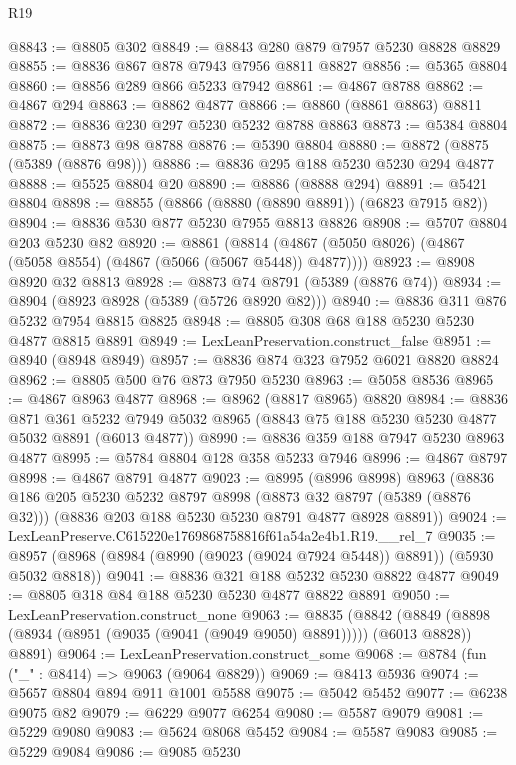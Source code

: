 \begin{lexlean}{R19}
\begin{coremodule}
@8843 := @8805 @302
@8849 := @8843 @280 @879 @7957 @5230 @8828 @8829
@8855 := @8836 @867 @878 @7943 @7956 @8811 @8827
@8856 := @5365 @8804
@8860 := @8856 @289 @866 @5233 @7942
@8861 := @4867 @8788
@8862 := @4867 @294
@8863 := @8862 @4877
@8866 := @8860 (@8861 @8863) @8811
@8872 := @8836 @230 @297 @5230 @5232 @8788 @8863
@8873 := @5384 @8804
@8875 := @8873 @98 @8788
@8876 := @5390 @8804
@8880 := @8872 (@8875 (@5389 (@8876 @98)))
@8886 := @8836 @295 @188 @5230 @5230 @294 @4877
@8888 := @5525 @8804 @20
@8890 := @8886 (@8888 @294)
@8891 := @5421 @8804
@8898 := @8855 (@8866 (@8880 (@8890 @8891)) (@6823 @7915 @82))
@8904 := @8836 @530 @877 @5230 @7955 @8813 @8826
@8908 := @5707 @8804 @203 @5230 @82
@8920 := @8861
    (@8814 (@4867 (@5050 @8026) (@4867 (@5058 @8554) (@4867 (@5066 (@5067 @5448)) @4877))))
@8923 := @8908 @8920 @32 @8813
@8928 := @8873 @74 @8791 (@5389 (@8876 @74))
@8934 := @8904 (@8923 @8928 (@5389 (@5726 @8920 @82)))
@8940 := @8836 @311 @876 @5232 @7954 @8815 @8825
@8948 := @8805 @308 @68 @188 @5230 @5230 @4877 @8815 @8891
@8949 := LexLeanPreservation.construct_false
@8951 := @8940 (@8948 @8949)
@8957 := @8836 @874 @323 @7952 @6021 @8820 @8824
@8962 := @8805 @500 @76 @873 @7950 @5230
@8963 := @5058 @8536
@8965 := @4867 @8963 @4877
@8968 := @8962 (@8817 @8965) @8820
@8984 := @8836
    @871
    @361
    @5232
    @7949
    @5032
    @8965
    (@8843 @75 @188 @5230 @5230 @4877 @5032 @8891 (@6013 @4877))
@8990 := @8836 @359 @188 @7947 @5230 @8963 @4877
@8995 := @5784 @8804 @128 @358 @5233 @7946
@8996 := @4867 @8797
@8998 := @4867 @8791 @4877
@9023 := @8995
    (@8996 @8998)
    @8963
    (@8836
      @186
      @205
      @5230
      @5232
      @8797
      @8998
      (@8873 @32 @8797 (@5389 (@8876 @32)))
      (@8836 @203 @188 @5230 @5230 @8791 @4877 @8928 @8891))
@9024 := LexLeanPreserve.C615220e1769868758816f61a54a2e4b1.R19.__rel_7
@9035 := @8957 (@8968 (@8984 (@8990 (@9023 (@9024 @7924 @5448)) @8891)) (@5930 @5032 @8818))
@9041 := @8836 @321 @188 @5232 @5230 @8822 @4877
@9049 := @8805 @318 @84 @188 @5230 @5230 @4877 @8822 @8891
@9050 := LexLeanPreservation.construct_none
@9063 := @8835
    (@8842 (@8849 (@8898 (@8934 (@8951 (@9035 (@9041 (@9049 @9050) @8891))))) (@6013 @8828)) @8891)
@9064 := LexLeanPreservation.construct_some
@9068 := @8784 (fun ("_" : @8414) => @9063 (@9064 @8829))
@9069 := @8413 @5936
@9074 := @5657 @8804 @894 @911 @1001 @5588
@9075 := @5042 @5452
@9077 := @6238 @9075 @82
@9079 := @6229 @9077 @6254
@9080 := @5587 @9079
@9081 := @5229 @9080
@9083 := @5624 @8068 @5452
@9084 := @5587 @9083
@9085 := @5229 @9084
@9086 := @9085 @5230

\end{coremodule}
\end{lexlean}
